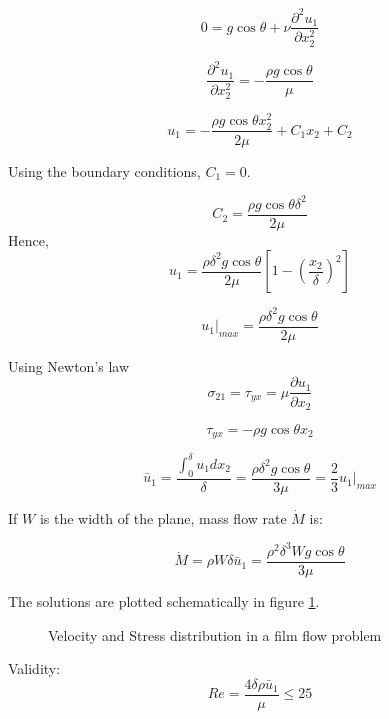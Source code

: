\begin{equation}
0 =  g \cos\theta + \nu \frac{\partial^2 u_1}{\partial x_2^2} 
\end{equation} 


$$ \frac{\partial^2 u_1}{\partial x_2^2} = -\frac{\rho g \cos\theta}{\mu} $$

$$ u_1 = -\frac{\rho g \cos\theta x^2_2}{2\mu} + C_1 x_2 + C_2 $$

Using the boundary conditions, $C_1 = 0$.

$$ C_2 = \frac{\rho g \cos\theta \delta^2}{2\mu} $$ 
Hence,
$$ u_1 = \frac{\rho \delta^2 g\cos\theta }{2 \mu}\left[1-\left(\frac{x_2}{\delta}\right)^2\right]$$

$$u_1|_{max} = \frac{\rho \delta^2 g\cos\theta}{2 \mu}$$

Using Newton's law $$\sigma_{21} = \tau_{yx} = \mu \frac{\partial u_1}{\partial x_2}$$

$$\tau_{yx} = -\rho g \cos\theta x_2$$


$$\bar{u}_1 = \frac{\int_0^\delta{u_1}dx_2}{\delta} = \frac{\rho \delta^2 g\cos\theta}{3 \mu} = \frac{2}{3} u_1|_{max}$$

If $W$ is the width of the plane, mass flow rate $\dot{M}$ is:

$$ \dot{M} = \rho W \delta \bar{u}_1 = \frac{\rho^2 \delta^3 W g \cos\theta}{3 \mu}$$

The solutions are plotted schematically in figure \ref{fallfilmsol}.

\begin{figure}[h]
\begin{center}
\end{center}
\caption{Velocity and Stress distribution in a film flow problem}
\label{fallfilmsol}
\end{figure}


Validity:
$$Re = \frac{4\delta \rho \bar{u}_1  }{\mu} \le 25$$ 


